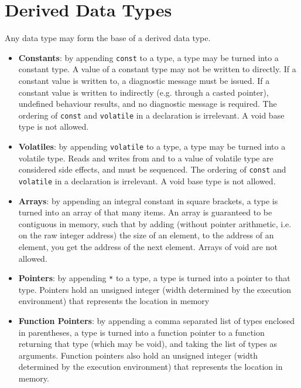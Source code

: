 \documentclass[letterpaper,12pt]{book}
\begin{document}
\section{Derived Data Types}

Any data type may form the base of a derived data type.

\begin{itemize}
	\item \textbf{Constants}: by appending \texttt{const} to a type, a type may be turned into a constant type. A value of a constant type may not be written to directly. If a constant value is written to, a diagnostic message must be issued. If a constant value is written to indirectly (e.g. through a casted pointer), undefined behaviour results, and no diagnostic message is required. The ordering of \texttt{const} and \texttt{volatile} in a declaration is irrelevant. A void base type is not allowed.
	
	\item \textbf{Volatiles}: by appending \texttt{volatile} to a type, a type may be turned into a volatile type. Reads and writes from and to a value of volatile type are considered side effects, and must be sequenced. The ordering of \texttt{const} and \texttt{volatile} in a declaration is irrelevant. A void base type is not allowed.
	
	\item \textbf{Arrays}: by appending an integral constant in square brackets, a type is turned into an array of that many items. An array is guaranteed to be contiguous in memory, such that by adding (without pointer arithmetic, i.e. on the raw integer address) the size of an element, to the address of an element, you get the address of the next element. Arrays of void are not allowed.
	
	\item \textbf{Pointers}: by appending \texttt{*} to a type, a type is turned into a pointer to that type. Pointers hold an unsigned integer (width determined by the execution environment) that represents the location in memory 
	
	\item \textbf{Function Pointers}: by appending a comma separated list of types enclosed in parentheses, a type is turned into a function pointer to a function returning that type (which may be void), and taking the list of types as arguments. Function pointers also hold an unsigned integer (width determined by the execution environment) that represents the location in memory.
\end{itemize}
\end{document}
